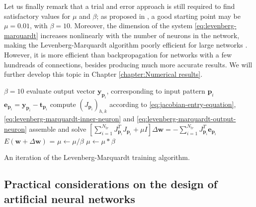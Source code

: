 \documentclass[12pt, a4paper, twoside, openright, notitlepage]{report}
\numberwithin{equation}{chapter}
\theoremstyle{theorem}
\theoremstyle{definition}
\theoremstyle{remark}
\theoremstyle{proposition}
\numberwithin{figure}{chapter}
\begin{document}
		Let us finally remark that a trial and error approach is still required to find satisfactory values for $\mu$ and $\beta$; as proposed in \cite{Mar63}, a good starting point may be $\mu = 0.01$, with $\beta = 10$. Moreover, the dimension of the system \eqref{eq:levenberg-marquardt} increases nonlinearly with the number of neurons in the network, making the Levenberg-Marquardt algorithm poorly efficient for large networks \cite{Hag94}. However, it is more efficient than backpropagation for networks with a few hundreads of connections, besides producing much more accurate results. We will further develop this topic in Chapter \ref{chapter:Numerical results}.
		
		\begin{algorithm}[H]
			\begin{algorithmic}[1]
					\State $\beta = 10$
						\State evaluate output vector $\mathbf{y}_{\mathbf{p}_i}$, corresponding to input pattern $\mathbf{p}_i$
						\State $\mathbf{e}_{\mathbf{p}_i} = \mathbf{y}_{\mathbf{p}_i} - \mathbf{t}_{\mathbf{p}_i}$
							\State compute $\left( J_{\mathbf{p}_i} \right)_{h,k}$ according to \eqref{eq:jacobian-entry-equation}, \eqref{eq:levenberg-marquardt-inner-neuron} and \eqref{eq:levenberg-marquardt-output-neuron} 
						\EndFor
					\EndFor
					\State assemble and solve $\left[ \sum_{i = 1}^{N_{tr}} J_{\mathbf{p}_i}^T J_{\mathbf{p}_i} + \mu I \right] \Delta \mathbf{w} = - \sum_{i = 1}^{N_{tr}} J_{\mathbf{p}_i}^T \mathbf{e}_{\mathbf{p}_i}$
					\State $E(\mathbf{w} + \Delta \mathbf{w})$ = 
						\State $\mu \leftarrow \mu / \beta$
					\Else
						\State $\mu \leftarrow \mu * \beta$
					\EndIf 
				\EndFunction
			\end{algorithmic}
			
			\caption{An iteration of the Levenberg-Marquardt training algorithm.}
			\label{alg:levenberg-marquardt}
		\end{algorithm}
						
	\subsection{Practical considerations on the design of artificial neural networks}
	\label{section:Practical considerations on the design of artificial neural networks}
	
\end{document}
